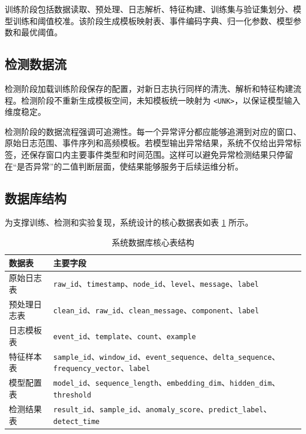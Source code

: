 训练阶段包括数据读取、预处理、日志解析、特征构建、训练集与验证集划分、模型训练和阈值校准。该阶段生成模板映射表、事件编码字典、归一化参数、模型参数和最优阈值。

\subsection{检测数据流}

检测阶段加载训练阶段保存的配置，对新日志执行同样的清洗、解析和特征构建流程。检测阶段不重新生成模板空间，未知模板统一映射为 \texttt{<UNK>}，以保证模型输入维度稳定。

检测阶段的数据流程强调可追溯性。每一个异常评分都应能够追溯到对应的窗口、原始日志范围、事件序列和高频模板。若模型输出异常结果，系统不仅给出异常标签，还保存窗口内主要事件类型和时间范围。这样可以避免异常检测结果只停留在“是否异常”的二值判断层面，使结果能够服务于后续运维分析。

\subsection{数据库结构}

为支撑训练、检测和实验复现，系统设计的核心数据表如表 \ref{tab:database_design_new} 所示。

\begin{table}[htbp]
    \centering
    \caption{系统数据库核心表结构}
    \label{tab:database_design_new}
    \begin{tabular}{p{3cm}p{9cm}}
        \hline
        \textbf{数据表} & \textbf{主要字段} \\
        \hline
        原始日志表 & \texttt{raw\_id}、\texttt{timestamp}、\texttt{node\_id}、\texttt{level}、\texttt{message}、\texttt{label} \\
        预处理日志表 & \texttt{clean\_id}、\texttt{raw\_id}、\texttt{clean\_message}、\texttt{component}、\texttt{label} \\
        日志模板表 & \texttt{event\_id}、\texttt{template}、\texttt{count}、\texttt{example} \\
        特征样本表 & \texttt{sample\_id}、\texttt{window\_id}、\texttt{event\_sequence}、\texttt{delta\_sequence}、\texttt{frequency\_vector}、\texttt{label} \\
        模型配置表 & \texttt{model\_id}、\texttt{sequence\_length}、\texttt{embedding\_dim}、\texttt{hidden\_dim}、\texttt{threshold} \\
        检测结果表 & \texttt{result\_id}、\texttt{sample\_id}、\texttt{anomaly\_score}、\texttt{predict\_label}、\texttt{detect\_time} \\
        \hline
    \end{tabular}
\end{table}

